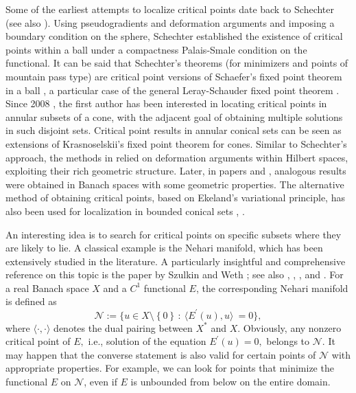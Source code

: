 \documentclass{birkjour}
\theoremstyle{definition}
\theoremstyle{remark}
\numberwithin{equation}{section}
\begin{document}
Some of the earliest attempts to localize critical points date back to
Schechter \cite{s1,s2} (see also \cite{st}). Using pseudogradients and
deformation arguments and imposing a boundary condition on the sphere,
Schechter established the existence of critical points within a ball under a
compactness Palais-Smale condition on the functional. It can be said that
Schechter's theorems (for minimizers and points of mountain pass type) are
critical point versions of Schaefer's fixed point theorem in a ball \cite[p.
139]{ag}, a particular case of the general Leray-Schauder fixed point
theorem \cite[Theorem 6.5.4]{ag}. Since 2008 \cite{p0}, the first author has
been interested in locating critical points in annular subsets of a cone,
with the adjacent goal of obtaining multiple solutions in such disjoint
sets. Critical point results in annular conical sets can be seen as
extensions of Krasnoselskii's fixed point theorem for cones. Similar to
Schechter's approach, the methods in \cite{p0} relied on deformation
arguments within Hilbert spaces, exploiting their rich geometric structure.
Later, in papers \cite{lpv} and \cite{ppv}, analogous results were obtained
in Banach spaces with some geometric properties. The alternative method of
obtaining critical points, based on Ekeland's variational principle, has
also been used for localization in bounded conical sets \cite{p1}, \cite{ppv}%
.%

An interesting idea is to search for critical points on specific subsets
where they are likely to lie. A classical example is the Nehari manifold,
which has been extensively studied in the literature. A particularly
insightful and comprehensive reference on this topic is the paper by Szulkin
and Weth \cite{sw}; see also \cite{cir}, \cite{cd}, \cite{dp}, \cite{s} and
\cite{w}. For a real Banach space $X$ and a $C^{1}$ functional $E$, the
corresponding Nehari manifold is defined as
\begin{equation*}
\mathcal{N}:=\{u\in X\setminus \left\{ 0\right\} \,:\ \langle E^{\prime
}(u),u\rangle \ =0\},
\end{equation*}%
where $\langle \cdot ,\cdot \rangle $ denotes the dual pairing between $%
X^{\ast }$ and $X$. Obviously, any nonzero critical point of $E,$ i.e.,
solution of the equation $E^{\prime }\left( u\right) =0,$ belongs to $%
\mathcal{N}.$ It may happen that the converse statement is also valid for
certain points of $\mathcal{N}$ with appropriate properties. For example, we
can look for points that minimize the functional $E$ on $\mathcal{N}$, even
if $E$ is unbounded from below on the entire domain.
\end{document}
